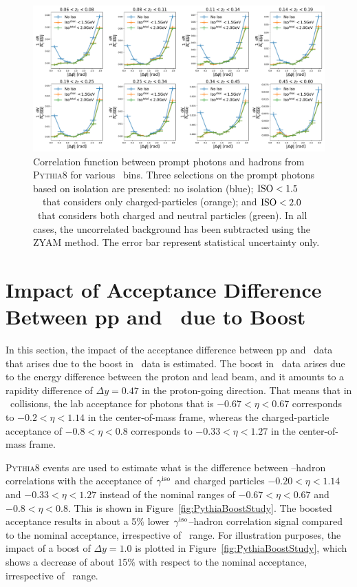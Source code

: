\begin{figure}
\centering
\includegraphics[width = 1.0 \textwidth]{Checks_Systematics/PythiaStudyNeutralIso}
\caption{Correlation function between prompt photons and hadrons from \textsc{Pythia8} for various \zt~bins. Three selections on the prompt photons based on isolation are presented: no isolation (blue); $\mathrm{ISO}< 1.5$~\GeVc~that considers only charged-particles (orange); and $\mathrm{ISO}<2.0$ \GeVc~that considers both charged and neutral particles (green). In all cases, the uncorrelated background has been subtracted using the ZYAM method. The error bar represent statistical uncertainty only. }
\label{fig:PythiaNeutralIsolation}
\end{figure}


\section{Impact of Acceptance Difference Between pp and \pPb~due to Boost}
\label{sec:bootstudy}

In this section, the impact of the acceptance difference between pp and \pPb~data that arises due to the boost in \pPb~data is estimated. The boost in \pPb~data arises due to the energy difference between the proton and lead beam, and it amounts to a rapidity difference of $\Delta y = 0.47$  in the proton-going direction. That means that in \pPb~collisions, the lab acceptance for photons that is $-0.67<\eta<0.67$ corresponds to $-0.2<\eta<1.14$ in the center-of-mass frame, whereas the charged-particle acceptance of $-0.8<\eta<0.8$ corresponds to $-0.33<\eta<1.27$  in the center-of-mass frame. 

\textsc{Pythia8} events are used to estimate what is the difference between \gammaiso--hadron correlations with the acceptance of $\gamma^\mathrm{iso}$ and charged particles  $-0.20<\eta<1.14$ and $-0.33<\eta<1.27$ instead of the nominal ranges of $-0.67<\eta<0.67$ and $-0.8<\eta<0.8$. This is shown in Figure~\ref{fig:PythiaBoostStudy}. The boosted acceptance results in about a 5\% lower $\gamma^\mathrm{iso}$--hadron correlation signal compared to the nominal acceptance, irrespective of \zt~range. For illustration purposes, the impact of a boost of $\Delta y =1.0$ is plotted in Figure~\ref{fig:PythiaBoostStudy}, which shows a decrease of about 15$\%$  with respect to the nominal acceptance, irrespective of \zt~range. 

